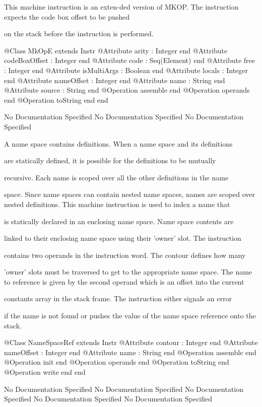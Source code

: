       This machine instruction is an exten-ded version of MKOP.
      The instruction expects the code box offset to be pushed

      on the stack before the instruction is performed.
\begin{Interface}
@Class MkOpE extends Instr
  @Attribute arity : Integer end
  @Attribute codeBoxOffset : Integer end
  @Attribute code : Seq(Element) end
  @Attribute free : Integer end
  @Attribute isMultiArgs : Boolean end
  @Attribute locals : Integer end
  @Attribute nameOffset : Integer end
  @Attribute name : String end
  @Attribute source : String end
  @Operation assemble end
  @Operation operands end
  @Operation toString end
end
\end{Interface}
No Documentation Specified
No Documentation Specified
No Documentation Specified

       A name space contains definitions. When a name space and its definitions

       are statically defined, it is possible for the definitions to be mutually

       recursive. Each name is scoped over all the other definitions in the name

       space. Since name spaces can contain nested name spaces, names are scoped over 
       nested definitions. This machine instruction is used to index a name that

       is statically declared in an enclosing name space. Name space contents are

       linked to their enclosing name space using their 'owner' slot. The instruction

       contains two operands in the instruction word. The contour defines how many

       'owner' slots must be traversed to get to the appropriate name space. The name 
       to reference is given by the second operand which is an offset into the current

       constants array in the stack frame. The instruction either signals an error

       if the name is not found or pushes the value of the name space reference 
       onto the stack.
\begin{Interface}
@Class NameSpaceRef extends Instr
  @Attribute contour : Integer end
  @Attribute nameOffset : Integer end
  @Attribute name : String end
  @Operation assemble end
  @Operation init end
  @Operation operands end
  @Operation toString end
  @Operation write end
end
\end{Interface}
No Documentation Specified
No Documentation Specified
No Documentation Specified
No Documentation Specified
No Documentation Specified

